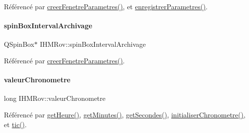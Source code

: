 Référencé par \hyperlink{class_i_h_m_rov_aed451139ac09ef18b7c92637761d80ce}{creer\+Fenetre\+Parametres()}, et \hyperlink{class_i_h_m_rov_a94d31f4e748f3e4549eab42c8bc7e367}{enregistrer\+Parametres()}.

\mbox{\label{class_i_h_m_rov_abc906e8e992ecdf5eb1dae5dc622b768}} 
\paragraph{\texorpdfstring{spin\+Box\+Interval\+Archivage}{spinBoxIntervalArchivage}}
{\footnotesize\ttfamily Q\+Spin\+Box$\ast$ I\+H\+M\+Rov\+::spin\+Box\+Interval\+Archivage\hspace{0.3cm}{\ttfamily [private]}}



Référencé par \hyperlink{class_i_h_m_rov_aed451139ac09ef18b7c92637761d80ce}{creer\+Fenetre\+Parametres()}.

\mbox{\label{class_i_h_m_rov_a38ad5c20c2347825c237e9b85bb5c7e6}} 
\paragraph{\texorpdfstring{valeur\+Chronometre}{valeurChronometre}}
{\footnotesize\ttfamily long I\+H\+M\+Rov\+::valeur\+Chronometre\hspace{0.3cm}{\ttfamily [private]}}



Référencé par \hyperlink{class_i_h_m_rov_a149d6d6325acf3f00bf025cb2fbac05f}{get\+Heure()}, \hyperlink{class_i_h_m_rov_ad6d275fe98c3dd1e40b2ef0defff3be9}{get\+Minutes()}, \hyperlink{class_i_h_m_rov_ad28dd7ea40587335f6554de60c828524}{get\+Secondes()}, \hyperlink{class_i_h_m_rov_a64002e867300c8aff2ebd4568acc107e}{initialiser\+Chronometre()}, et \hyperlink{class_i_h_m_rov_a4a0d3a0741d0669ede732b630eae54c6}{tic()}.

\mbox{\label{class_i_h_m_rov_a238e50788d62ae2c34b4ae6c8082d596}} 
